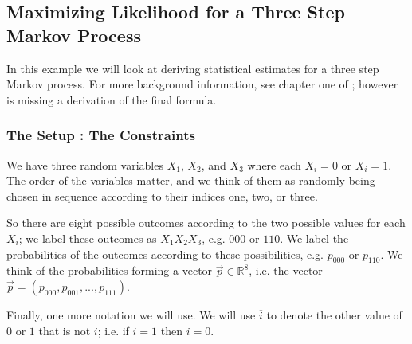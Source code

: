\subsection{Maximizing Likelihood for a Three Step Markov Process}

In this example we will look at deriving statistical estimates for a three step Markov process. For
more background information, see chapter one of \cite{Sullivant}; however \cite{Sullivant} is missing
a derivation of the final formula.

\subsubsection*{The Setup : The Constraints}

\newcommand{\flip}[1]{\overline{#1}}

We have three random variables \(X_1\), \(X_2\), and \(X_3\) where each \(X_i = 0\) or \(X_i = 1\). The order
of the variables matter, and we think of them as randomly being chosen in sequence according to their indices
one, two, or three. 

So there are eight possible outcomes according to the two possible values for each \(X_i\); we label these
outcomes as \(X_1X_2X_3\), e.g. \(000\) or \(110\). We label the probabilities of the outcomes according to these  
possibilities, e.g. \(p_{000}\) or \(p_{110}\). We think of the probabilities forming a vector 
\(\vec p \in \mathbb R^8\), i.e. the vector \(\vec p = (p_{000}, p_{001}, ..., p_{111})\). 

Finally, one more notation we will use. We will use \(\flip i\) to denote the other value of \(0\) or \(1\) that 
is not \(i\); i.e. if \(i = 1\) then \(\flip i = 0\).

